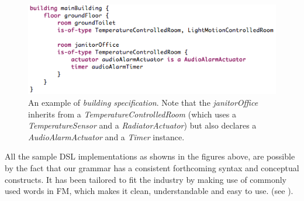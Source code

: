 \begin{figure}
  \centering
  \includegraphics[scale=.5]{dsl-building-definition.png}  
  \caption{An example of \textit{building specification}. Note that the \textit{janitorOffice} inherits from a \textit{TemperatureControlledRoom} (which uses a \textit{TemperatureSensor} and a \textit{RadiatorActuator}) but also declares a \textit{AudioAlarmActuator} and a \textit{Timer} instance.}
  \label{fig:dsl-building-definition}
\end{figure}

All the sample DSL implementations as showns in the figures above, are possible by the fact that our grammar has a consistent forthcoming syntax and conceptual constructs. It has been tailored to fit the industry by making use of commonly used words in FM, which makes it clean, understandable and easy to use. (see ).